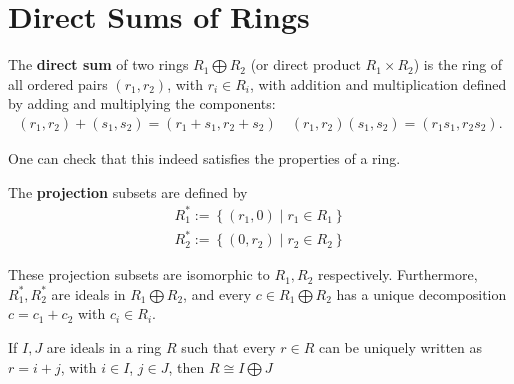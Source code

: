 \documentclass{memoir}
\begin{document}
\section{Direct Sums of Rings}
\label{sec:direct_sums_of_rings}
\begin{defn}
	The \textbf{direct sum} of two rings \(R_1\bigoplus R_2\) (or direct product \(R_1\times R_2\)) is the ring of all ordered pairs \((r_1,r_2)\), with \(r_i \in R_i\), with addition and multiplication defined by adding and multiplying the components:
	\begin{align*}
		(r_1,r_2) + (s_1,s_2) = (r_1+s_1,r_2+s_2) \quad (r_1,r_2)(s_1,s_2) = (r_1s_1,r_2s_2).
	\end{align*}
\end{defn}
One can check that this indeed satisfies the properties of a ring.
\begin{defn}[Projection]
	The \textbf{projection} subsets are defined by
	\begin{align*}
		R_1^* := \left\{(r_1,0) \mid r_1 \in R_1 \right\} \\
		R_2^* := \left\{(0,r_2) \mid r_2 \in R_2 \right\} 
	\end{align*}
\end{defn}
These projection subsets are isomorphic to \(R_1,R_2\) respectively. Furthermore, \(R_1^{*},R_2^{*}\) are ideals in \(R_1\bigoplus R_2\), and every \(c \in R_1 \bigoplus R_2\) has a unique decomposition \(c = c_1 + c_2\) with \(c_i \in R_i\).
\begin{prop}
	If \(I,J\) are ideals in a ring \(R\) such that every \(r \in R\) can be uniquely written as \(r = i + j\), with \(i \in I\), \(j \in J\), then \(R \cong I\bigoplus J\)
\end{prop}
\end{document}
